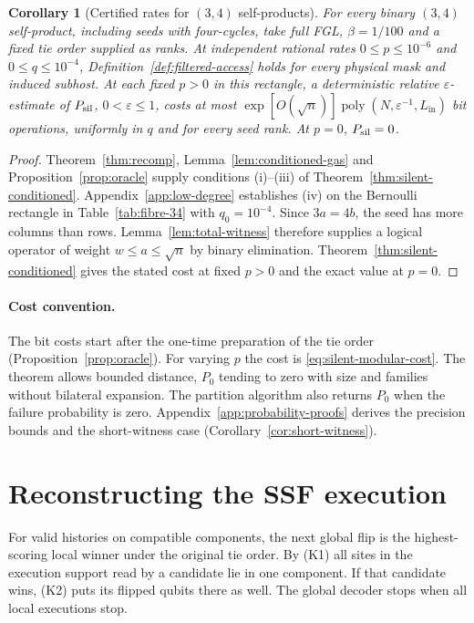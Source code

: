 \documentclass[10pt,twocolumn]{article}
\newtheorem{corollary}[theorem]{Corollary}
\theoremstyle{definition}
\DeclareMathOperator{\poly}{poly}
\newcommand{\Lin}{L_{\mathrm{in}}}
\begin{document}
\begin{samepage}
\begin{corollary}[Certified rates for $(3,4)$ self-products]\label{cor:certified-34}
For every binary $(3,4)$ self-product, including seeds with four-cycles,
take full FGL, $\beta=1/100$ and a fixed tie order supplied as ranks.
At independent rational rates $0\le p\le10^{-6}$ and $0\le q\le10^{-4}$,
Definition~\ref{def:filtered-access} holds for every physical mask
and induced subhost. At each fixed $p>0$ in this rectangle, a
deterministic relative $\varepsilon$-estimate of $P_{\rm sil}$,
$0<\varepsilon\le1$, costs at most
$\exp[O(\sqrt n)]\poly(N,\varepsilon^{-1},\Lin)$ bit operations,
uniformly in $q$ and for every seed rank. At $p=0$, $P_{\rm sil}=0$.
\end{corollary}
\end{samepage}
\begin{proof}
Theorem~\ref{thm:recomp}, Lemma~\ref{lem:conditioned-gas} and
Proposition~\ref{prop:oracle} supply conditions (i)--(iii) of
Theorem~\ref{thm:silent-conditioned}. Appendix~\ref{app:low-degree}
establishes (iv) on the Bernoulli rectangle in Table~\ref{tab:fibre-34}
with $q_0=10^{-4}$. Since $3a=4b$, the seed has more columns than rows.
Lemma~\ref{lem:total-witness} therefore supplies a logical operator of
weight $w\le a\le\sqrt n$ by binary elimination. Theorem~\ref{thm:silent-conditioned}
gives the stated cost at fixed $p>0$ and the exact value at $p=0$.
\end{proof}

\paragraph{Cost convention.}
The bit costs start after the one-time preparation of the tie order
(Proposition~\ref{prop:oracle}). For varying $p$ the cost is
\eqref{eq:silent-modular-cost}. The theorem allows bounded distance,
$P_0$ tending to zero with size and families without bilateral
expansion. The partition algorithm also returns $P_0$ when the failure
probability is zero. Appendix~\ref{app:probability-proofs} derives the
precision bounds and the short-witness case (Corollary~\ref{cor:short-witness}).

\section{Reconstructing the SSF execution}\label{sec:block1}

For valid histories on compatible components, the next global flip is
the highest-scoring local winner under the original tie order. By (K1)
all sites in the execution support read by a candidate lie in one
component. If that candidate wins, (K2) puts its flipped qubits there
as well. The global decoder stops when all local executions stop.
\end{document}
